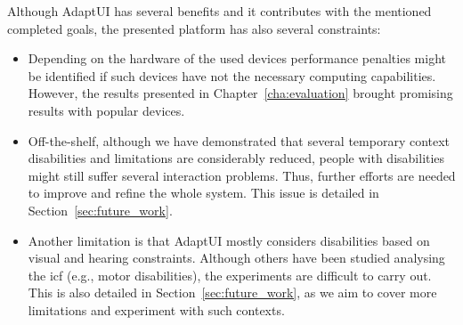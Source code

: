 Although AdaptUI has several benefits and it contributes with the mentioned 
completed goals, the presented platform has also several constraints:

\begin{itemize}
  \item Depending on the hardware of the used devices performance penalties might
  be identified if such devices have not the necessary computing capabilities.
  However, the results presented in Chapter~\ref{cha:evaluation} brought promising 
  results with popular devices.
  
  \item Off-the-shelf, although we have demonstrated that several temporary context 
  disabilities and limitations are considerably reduced, people with 
  disabilities might still suffer several interaction problems. Thus, further 
  efforts are needed to improve and refine the whole system. This issue is 
  detailed in Section~\ref{sec:future_work}.
  
  \item Another limitation is that AdaptUI mostly considers disabilities based
  on visual and hearing constraints. Although others have been studied analysing
  the \ac{icf} (e.g., motor disabilities), the experiments are difficult to
  carry out. This is also detailed in Section~\ref{sec:future_work}, as we aim
  to cover more limitations and experiment with such contexts.
\end{itemize}